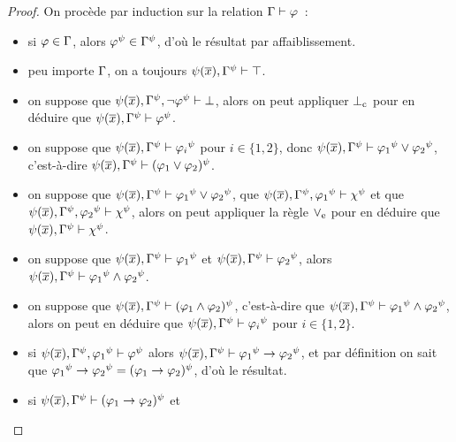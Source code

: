 \begin{proof}
  On procède par induction sur la relation $\Gamma \vdash \varphi$~:
  \begin{itemize}
  \item[$\Rax$~:] si $\varphi \in \Gamma$, alors $\varphi^\psi \in \Gamma^\psi$,
    d'où le résultat par affaiblissement.
  \item[$\RtopI$~:] peu importe $\Gamma$, on a toujours
    $\psi(\overline{x}),\Gamma^\psi \vdash \top$.
  \item[$\RbotC$~:] on suppose que
    $\psi(\overline{x}),\Gamma^\psi, \lnot \varphi^\psi \vdash \bot$, alors on peut
    appliquer $\RbotC$ pour en déduire que
    $\psi(\overline{x}), \Gamma^\psi \vdash \varphi^\psi$.
  \item[$\RorI$~:] on suppose que
    $\psi(\overline{x}),\Gamma^\psi \vdash {\varphi_i}^\psi$ pour $i \in \{1,2\}$,
    donc
    $\psi(\overline{x}),\Gamma^\psi \vdash {\varphi_1}^\psi\lor {\varphi_2}^\psi$,
    c'est-à-dire
    $\psi(\overline{x}),\Gamma^\psi \vdash (\varphi_1\lor \varphi_2)^\psi$.
  \item[$\RorE$~:] on suppose que
    $\psi(\overline{x}),\Gamma^\psi\vdash {\varphi_1}^\psi\lor {\varphi_2}^\psi$,
    que $\psi(\overline{x}),\Gamma^\psi, {\varphi_1}^\psi \vdash \chi^\psi$
    et que $\psi(\overline{x}),\Gamma^\psi,{\varphi_2}^\psi\vdash \chi^\psi$,
    alors on peut appliquer la règle
    $\RorE$ pour en déduire que
    $\psi(\overline{x}),\Gamma^\psi \vdash \chi^\psi$.
  \item[$\RandI$~:] on suppose que
    $\psi(\overline{x}),\Gamma^\psi\vdash {\varphi_1}^\psi$ et
    $\psi(\overline{x}),\Gamma^\psi\vdash {\varphi_2}^\psi$, alors
    $\psi(\overline{x}),\Gamma^\psi\vdash {\varphi_1}^\psi \land {\varphi_2}^\psi$.
  \item[$\RandE$~:] on suppose que
    $\psi(\overline{x}),\Gamma^\psi\vdash (\varphi_1\land \varphi_2)^\psi$,
    c'est-à-dire que
    $\psi(\overline{x}),\Gamma^\psi\vdash {\varphi_1}^\psi \land {\varphi_2}^\psi$,
    alors on peut en déduire que
    $\psi(\overline{x}),\Gamma^\psi\vdash {\varphi_i}^\psi$ pour
    $i \in \{1,2\}$.
  \item[$\RtoI$~:] si
    $\psi(\overline{x}),\Gamma^\psi,{\varphi_1}^\psi\vdash \varphi^\psi$ alors
    $\psi(\overline{x}),\Gamma^\psi\vdash {\varphi_1}^\psi \to {\varphi_2}^\psi$, et
    par définition on sait que
    ${\varphi_1}^\psi\to {\varphi_2}^\psi = (\varphi_1\to \varphi_2)^\psi$, d'où
    le résultat.
  \item[$\RtoE$~:] si
    $\psi(\overline{x}),\Gamma^\psi \vdash (\varphi_1\to\varphi_2)^\psi$ et

\end{itemize}
\end{proof}
